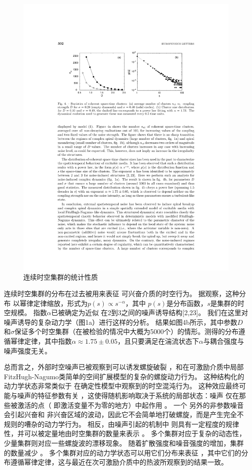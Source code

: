 \documentclass[
    bachelor,
    nofont, %
    pdflinks,
    ]{xjtuthesis}
\begin{document}
\begin{figure}[!ht]
\centering
\includegraphics[scale=1]{fig4.pdf}
\caption{连续时空集群的统计性质}
\end{figure}

\medskip
连续时空集群的分布在过去被⽤来表征
可兴奋介质的时空⾏为。 据观察，这种分布
以幂律定律缩放，形式为$p(s)\propto s^{-\alpha}$，其中 $p(s)$是分布函数，$s$是集群的时空规模。 指数$\alpha$已被确定为近似
在2到3之间的噪声诱导结构[2,23]。 我们在这⾥对噪声诱导的复杂动⼒学（图1a）进⾏这样的分析。 结果如图4b所⽰，其中参数$D$和$\sigma$保证多个时空集群（在被检验的情况中大概为5000个）的情形。测得的分布遵循幂律定律，其中指数$\alpha \approx 1.75\pm 0.05$，且只要满足在湍流状态下$\alpha$与耦合强度与噪声强度无关。

\medskip
总而言之，外部时空噪声已被观察到可以诱发螺旋破裂
，和在可激励介质中局部FitzHugh-Nagumo类简单的空间扩展模型的复杂的螺旋动⼒行为。 这种结构化的动⼒学状态⾮常类似于
在确定性模型中观察到的时空混沌⾏为。 这种效应最终可能与噪声的特征参数有关
，这使得随机影响取决于系统的局部状态：噪声
仅在那些被激活的点（ 即激活变量不为零的地⽅）中起作⽤ 。 ⼀个
另外的⾮参数噪⾳会引起兴奋和
⾮兴奋区域的波动，因此它不会简单地打破螺旋，⽽是产⽣完全不规则的嘈杂的动力学行为。 相反，由噪声引起的机制中
则具有⼀定程度的规律性，并可以被定量地由时空集群的数量来表示
。 多个集群对应于复杂的动态性，少量集群则对应一些螺旋波的漂移现象。 
随着扩散强度和噪⾳强度的增加，集群的数量减少
。 多个集群对应的动力学状态可以⽤它们分布来表征
，其中它们的分布遵循幂律定律，这与最近在次可激励介质中的热波所观察到的结果⼀致。
\end{document}
